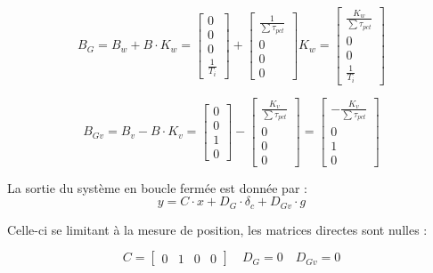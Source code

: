 \begin{equation}
    B_G = B_w + B \cdot K_w = \begin{bmatrix} 0 \\ 0 \\ 0 \\ \frac{1}{T_i} \end{bmatrix} + \begin{bmatrix} \frac{1}{\sum\tau_{pct}} \\ 0 \\ 0 \\ 0 \end{bmatrix} K_w = \begin{bmatrix} \frac{K_w}{\sum\tau_{pct}} \\ 0 \\ 0 \\ \frac{1}{T_i} \end{bmatrix}
\end{equation}

\begin{equation}
    B_{Gv} = B_v - B \cdot K_v = \begin{bmatrix} 0 \\ 0 \\ 1 \\ 0 \end{bmatrix} - \begin{bmatrix} \frac{K_v}{\sum\tau_{pct}} \\ 0 \\ 0 \\ 0 \end{bmatrix} = \begin{bmatrix} -\frac{K_v}{\sum\tau_{pct}} \\ 0 \\ 1 \\ 0 \end{bmatrix}
\end{equation}

La sortie du système en boucle fermée est donnée par :
\begin{equation}
    y = C \cdot x + D_G \cdot \delta_c + D_{Gv} \cdot g
\end{equation}

Celle-ci se limitant à la mesure de position, les matrices directes sont nulles :

\begin{equation}
    C = \begin{bmatrix} 0 & 1 & 0 & 0 \end{bmatrix} \quad D_G = 0 \quad D_{Gv} = 0
\end{equation}

